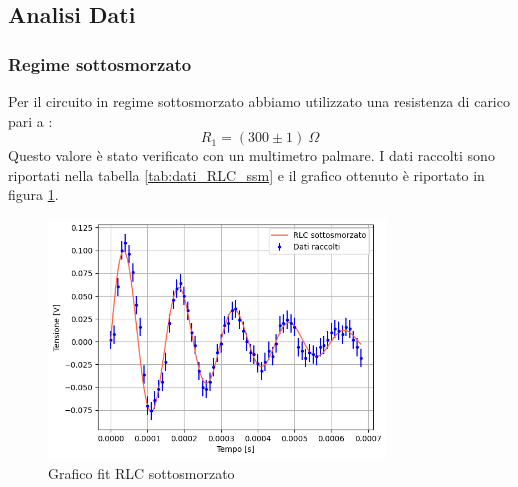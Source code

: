 \documentclass[letterpaper,12pt]{article}
\begin{document}
\subsection{Analisi Dati}

\subsubsection{Regime sottosmorzato}
Per il circuito in regime sottosmorzato abbiamo utilizzato una resistenza di carico pari a : $$R_1 =(300\pm1)\ \Omega$$
Questo valore è stato verificato con un multimetro palmare.
I dati raccolti sono riportati nella tabella \ref{tab:dati_RLC_ssm} e il grafico ottenuto è riportato in figura \ref{fig:fitRLCsotto}.\\
\begin{figure}[h!]
	\centering
	\includegraphics[width=0.8\textwidth]{RLCsotto.png}
	\caption{Grafico fit RLC sottosmorzato}
	\label{fig:fitRLCsotto}
\end{figure}
\end{document}
